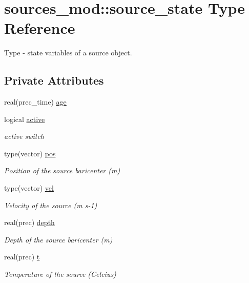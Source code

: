 \hypertarget{structsources__mod_1_1source__state}{}\section{sources\+\_\+mod\+:\+:source\+\_\+state Type Reference}
\label{structsources__mod_1_1source__state}


Type -\/ state variables of a source object.  


\subsection*{Private Attributes}
\begin{DoxyCompactItemize}
\item 
real(prec\+\_\+time) \hyperlink{structsources__mod_1_1source__state_a4ec18178b2bfbf4769892f26d62aa6f7}{age}
\item 
logical \hyperlink{structsources__mod_1_1source__state_ab31d51c870b76a1e4ca9b03f5847a7c2}{active}
\begin{DoxyCompactList}\small\item\em active switch \end{DoxyCompactList}\item 
type(vector) \hyperlink{structsources__mod_1_1source__state_a8dacf7040158bb5214f66476bf1a1c3d}{pos}
\begin{DoxyCompactList}\small\item\em Position of the source baricenter (m) \end{DoxyCompactList}\item 
type(vector) \hyperlink{structsources__mod_1_1source__state_a52c6f025eb262a7a07b2a8b4ec7065ac}{vel}
\begin{DoxyCompactList}\small\item\em Velocity of the source (m s-\/1) \end{DoxyCompactList}\item 
real(prec) \hyperlink{structsources__mod_1_1source__state_a4dbafcfac12c749efd402a71e01a25cd}{depth}
\begin{DoxyCompactList}\small\item\em Depth of the source baricenter (m) \end{DoxyCompactList}\item 
real(prec) \hyperlink{structsources__mod_1_1source__state_a7d51970a13f9664bbaf9d09afea0b363}{t}
\begin{DoxyCompactList}\small\item\em Temperature of the source (Celcius) \end{DoxyCompactList}\end{DoxyCompactItemize}


